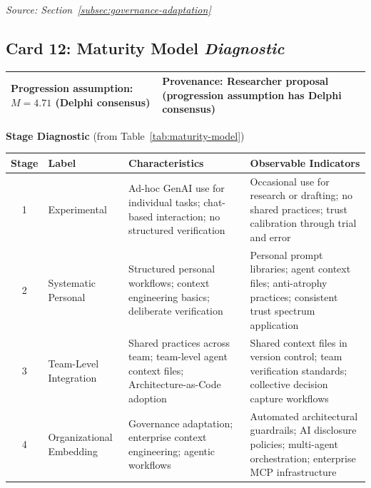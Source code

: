 \vspace{0.5em}
\textit{Source: Section~\ref{subsec:governance-adaptation}}

\clearpage
\subsection*{Card 12: Maturity Model \hfill \textit{Diagnostic}}

\begin{tabular}{|p{7cm}|p{6cm}|}
    \hline
    \textbf{Progression assumption:} $M = 4.71$ (Delphi consensus) & \textbf{Provenance:} Researcher proposal (progression assumption has Delphi consensus) \\
    \hline
\end{tabular}

\vspace{0.5em}
\textbf{Stage Diagnostic} (from Table~\ref{tab:maturity-model})

\begin{tabular}{|c|p{2.8cm}|p{4.5cm}|p{4.5cm}|}
    \hline
    \textbf{Stage} & \textbf{Label} & \textbf{Characteristics} & \textbf{Observable Indicators} \\
    \hline
    1 & Experimental & Ad-hoc GenAI use for individual tasks; chat-based interaction; no structured verification & Occasional use for research or drafting; no shared practices; trust calibration through trial and error \\
    \hline
    2 & Systematic Personal & Structured personal workflows; context engineering basics; deliberate verification & Personal prompt libraries; agent context files; anti-atrophy practices; consistent trust spectrum application \\
    \hline
    3 & Team-Level Integration & Shared practices across team; team-level agent context files; Architecture-as-Code adoption & Shared context files in version control; team verification standards; collective decision capture workflows \\
    \hline
    4 & Organizational Embedding & Governance adaptation; enterprise context engineering; agentic workflows & Automated architectural guardrails; AI disclosure policies; multi-agent orchestration; enterprise MCP infrastructure \\
    \hline
\end{tabular}

